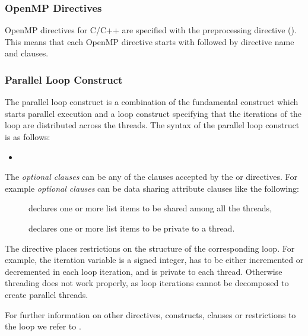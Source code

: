 \subsubsection{OpenMP Directives}

OpenMP directives for C/C++ are specified with the \textbf{}
preprocessing directive (\cite{openMP05}). This means that each
OpenMP directive starts with \textbf{} followed by
directive name and clauses. 
 
\subsubsection{Parallel Loop Construct}

The parallel loop construct is a combination of the fundamental
construct \textbf{} which starts parallel execution and
a loop construct specifying that the iterations of the loop are
distributed across the threads. The syntax of the parallel loop
construct  is as follows:

\begin{itemize}
\item {} 
\end{itemize} 

The \textit{optional clauses} can be any of the clauses accepted by the
 or  directives. For
example \textit{optional clauses} can be data sharing attribute
clauses like the following:

\begin{description}
\item[] declares one or more list items to
  be shared among all the threads,
\item[] declares one or more list items
  to be private to a thread.
\end{description}

The  directive places restrictions on the structure
of the corresponding loop. For example, the iteration variable is
a signed integer, has to be either incremented or decremented in each
loop iteration, and is private to each thread. Otherwise threading does
not work properly, as loop iterations cannot be decomposed to create
parallel threads.

For further information on other directives, constructs, clauses or
restrictions to the  loop we refer to \cite{openMP05}.

